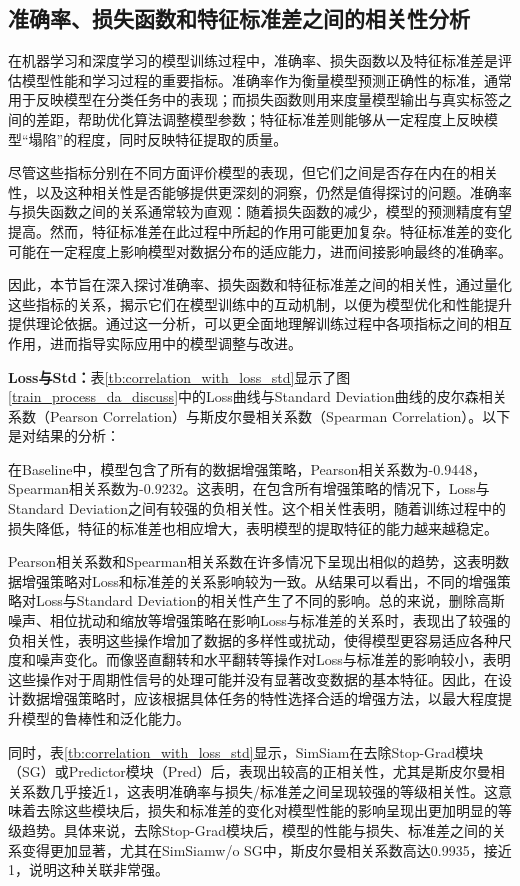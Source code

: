\documentclass[master]{thesis-uestc}
\begin{document}
\subsection{准确率、损失函数和特征标准差之间的相关性分析}

在机器学习和深度学习的模型训练过程中，准确率、损失函数以及特征标准差是评估模型性能和学习过程的重要指标。准确率作为衡量模型预测正确性的标准，通常用于反映模型在分类任务中的表现；而损失函数则用来度量模型输出与真实标签之间的差距，帮助优化算法调整模型参数；特征标准差则能够从一定程度上反映模型“塌陷”的程度，同时反映特征提取的质量。

尽管这些指标分别在不同方面评价模型的表现，但它们之间是否存在内在的相关性，以及这种相关性是否能够提供更深刻的洞察，仍然是值得探讨的问题。准确率与损失函数之间的关系通常较为直观：随着损失函数的减少，模型的预测精度有望提高。然而，特征标准差在此过程中所起的作用可能更加复杂。特征标准差的变化可能在一定程度上影响模型对数据分布的适应能力，进而间接影响最终的准确率。

因此，本节旨在深入探讨准确率、损失函数和特征标准差之间的相关性，通过量化这些指标的关系，揭示它们在模型训练中的互动机制，以便为模型优化和性能提升提供理论依据。通过这一分析，可以更全面地理解训练过程中各项指标之间的相互作用，进而指导实际应用中的模型调整与改进。

\textbf{Loss与Std：}表\ref{tb:correlation_with_loss_std}显示了图\ref{train_process_da_discuss}中的Loss曲线与Standard Deviation曲线的皮尔森相关系数（Pearson Correlation）与斯皮尔曼相关系数（Spearman Correlation）。以下是对结果的分析：

在Baseline中，模型包含了所有的数据增强策略，Pearson相关系数为-0.9448，Spearman相关系数为-0.9232。这表明，在包含所有增强策略的情况下，Loss与Standard Deviation之间有较强的负相关性。这个相关性表明，随着训练过程中的损失降低，特征的标准差也相应增大，表明模型的提取特征的能力越来越稳定。

Pearson相关系数和Spearman相关系数在许多情况下呈现出相似的趋势，这表明数据增强策略对Loss和标准差的关系影响较为一致。从结果可以看出，不同的增强策略对Loss与Standard Deviation的相关性产生了不同的影响。总的来说，删除高斯噪声、相位扰动和缩放等增强策略在影响Loss与标准差的关系时，表现出了较强的负相关性，表明这些操作增加了数据的多样性或扰动，使得模型更容易适应各种尺度和噪声变化。而像竖直翻转和水平翻转等操作对Loss与标准差的影响较小，表明这些操作对于周期性信号的处理可能并没有显著改变数据的基本特征。因此，在设计数据增强策略时，应该根据具体任务的特性选择合适的增强方法，以最大程度提升模型的鲁棒性和泛化能力。

同时，表\ref{tb:correlation_with_loss_std}显示，SimSiam在去除Stop-Grad模块（SG）或Predictor模块（Pred）后，表现出较高的正相关性，尤其是斯皮尔曼相关系数几乎接近1，这表明准确率与损失/标准差之间呈现较强的等级相关性。这意味着去除这些模块后，损失和标准差的变化对模型性能的影响呈现出更加明显的等级趋势。具体来说，去除Stop-Grad模块后，模型的性能与损失、标准差之间的关系变得更加显著，尤其在SimSiamw/o SG中，斯皮尔曼相关系数高达0.9935，接近1，说明这种关联非常强。
\end{document}

